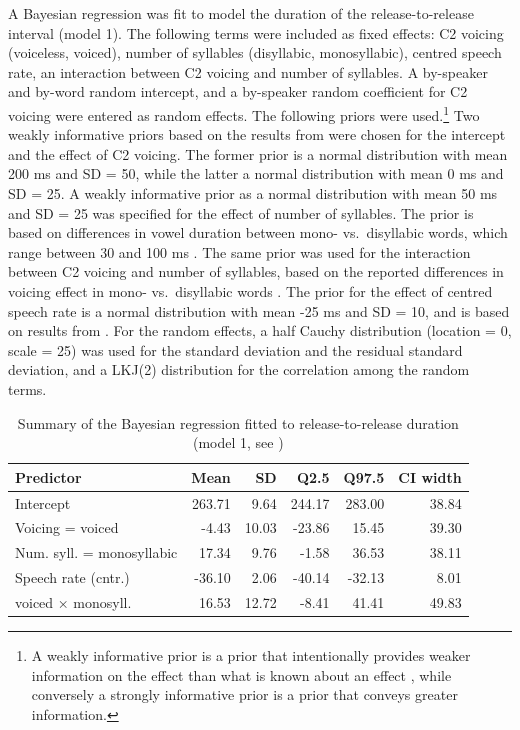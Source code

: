 \documentclass[12pt,a4paper,]{article}
\begin{document}
A Bayesian regression was fit to model the duration of the
release-to-release interval (model 1). The following terms were included
as fixed effects: C2 voicing (voiceless, voiced), number of syllables
(disyllabic, monosyllabic), centred speech rate, an interaction between
C2 voicing and number of syllables. A by-speaker and by-word random
intercept, and a by-speaker random coefficient for C2 voicing were
entered as random effects. The following priors were
used.\footnote{A weakly informative prior is a prior that intentionally provides weaker information on the effect than what is known about an effect \citep{gelman2006a}, while conversely a strongly informative prior is a prior that conveys greater information.}
Two weakly informative priors based on the results from
\citet{coretta2019k} were chosen for the intercept and the effect of C2
voicing. The former prior is a normal distribution with mean 200 ms and
SD = 50, while the latter a normal distribution with mean 0 ms and SD =
25. A weakly informative prior as a normal distribution with mean 50 ms
and SD = 25 was specified for the effect of number of syllables. The
prior is based on differences in vowel duration between mono-
vs.~disyllabic words, which range between 30 and 100 ms
\citep{sharf1962, klatt1973}. The same prior was used for the
interaction between C2 voicing and number of syllables, based on the
reported differences in voicing effect in mono- vs.~disyllabic words
\citep{sharf1962, klatt1973}. The prior for the effect of centred speech
rate is a normal distribution with mean -25 ms and SD = 10, and is based
on results from \citet{coretta2019k}. For the random effects, a half
Cauchy distribution (location = 0, scale = 25) was used for the standard
deviation and the residual standard deviation, and a LKJ(2) distribution
for the correlation among the random terms.

\begin{table}

\caption{\label{tab:rr-1-table}Summary of the Bayesian regression fitted to release-to-release duration (model 1, see )}
\centering
\fontsize{8}{10}\selectfont
\begin{tabular}[t]{lrrrrr}
\toprule
Predictor & Mean & SD & Q2.5 & Q97.5 & CI width\\
\midrule
Intercept & 263.71 & 9.64 & 244.17 & 283.00 & 38.84\\
Voicing = voiced & -4.43 & 10.03 & -23.86 & 15.45 & 39.30\\
Num. syll. = monosyllabic & 17.34 & 9.76 & -1.58 & 36.53 & 38.11\\
Speech rate (cntr.) & -36.10 & 2.06 & -40.14 & -32.13 & 8.01\\
voiced × monosyll. & 16.53 & 12.72 & -8.41 & 41.41 & 49.83\\
\bottomrule
\end{tabular}
\end{table}
\end{document}
